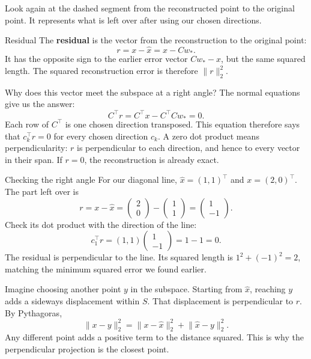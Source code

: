 \documentclass[a4paper,12pt,oneside]{report}
\begin{document}
Look again at the dashed segment from the reconstructed point to
the original point. It represents what is left over after using
our chosen directions.

\begin{frameddefn}{Residual}
The \textbf{residual} is the vector from the reconstruction to the
original point:
\[
  r=x-\hat{x}=x-Cw_*.
\]
It has the opposite sign to the earlier error vector $Cw_*-x$,
but the same squared length. The squared reconstruction error is
therefore $\lVert r\rVert_2^2$.
\end{frameddefn}

Why does this vector meet the subspace at a right angle?
The normal equations give us the answer:
\[
  C^\top r=C^\top x-C^\top Cw_*=0.
\]
Each row of $C^\top$ is one chosen direction transposed. This equation
therefore says that $c_k^\top r=0$ for every chosen direction $c_k$.
A zero dot product means perpendicularity: $r$ is perpendicular to
each direction, and hence to every vector in their span.
If $r=0$, the reconstruction is already exact.

\begin{framedexample}{Checking the right angle}
For our diagonal line, $\hat{x}=(1,1)^\top$ and $x=(2,0)^\top$.
The part left over is
\[
  r=x-\hat{x}
   =\begin{pmatrix}2\\0\end{pmatrix}
    -\begin{pmatrix}1\\1\end{pmatrix}
   =\begin{pmatrix}1\\-1\end{pmatrix}.
\]
Check its dot product with the direction of the line:
\[
  c_1^\top r=(1,1)\begin{pmatrix}1\\-1\end{pmatrix}=1-1=0.
\]
The residual is perpendicular to the line. Its squared length is
$1^2+(-1)^2=2$, matching the minimum squared error we found earlier.
\end{framedexample}

Imagine choosing another point $y$ in the subspace. Starting from
$\hat{x}$, reaching $y$ adds a sideways displacement within $S$.
That displacement is perpendicular to $r$. By Pythagoras,
\[
  \lVert x-y\rVert_2^2
  =\lVert x-\hat{x}\rVert_2^2+\lVert\hat{x}-y\rVert_2^2.
\]
Any different point adds a positive term to the distance squared.
This is why the perpendicular projection is the closest point.
\end{document}
